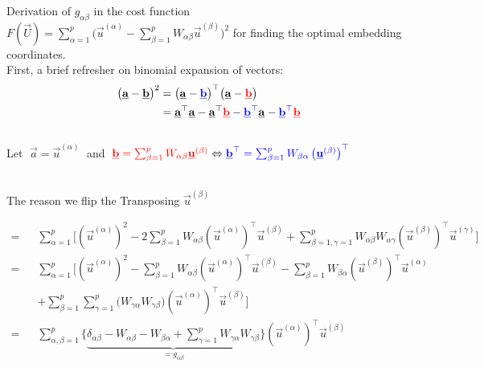 \begin{frame}%
	Derivation of $g_{\alpha \beta}$ in the cost function
	$F(\vec U) =
    \sum_{\alpha=1}^{p} 
	\bigg(  \vec{u}^{(\alpha)}  - \sum_{\beta=1}^{p} W_{\alpha \beta} \vec{u}^{(\beta)}
	\bigg) ^ 2
    $ 
    for finding the optimal embedding coordinates.\\
    First, a brief refresher on binomial expansion of vectors:
    \begin{align}
    \big( 
		\vec{a}
		- \vec{b}
	\big) ^ 2 
    &= \big(  \vec{a} - {\color{blue}\vec{b}} \big)^\top \big(  \vec{a} - {\color{red}\vec{b}} \big)\\
    &= \vec a^\top \vec a 
    - \vec a^\top {\color{red}\vec{b}}
    - {\color{blue}\vec{b}^\top} \vec a 
    - {\color{blue}\vec{b}^\top} {\color{red}\vec{b}}
    \end{align}\\
    
    Let $\;\vec a = \vec u^{(\alpha)}\;$ and 
    $\;{\color{red}
    \vec{b}=\sum_{\beta=1}^{p} W_{\alpha \beta} \vec{u}^{(\beta)}
    } \Leftrightarrow {\color{blue}
    \vec{b}^{\top}=\sum_{\beta=1}^{p} 
    W_{\beta \alpha} \left(\vec{u}^{(\beta)}\right)^\top
    }
    $
    
    \\
    The reason we flip the Transposing $\vec u^{(\beta)}$ 
    
    \begin{align}
	= &\sum_{\alpha=1}^{p} 
	\bigg[ 
	(\vec{u}^{(\alpha)})^2
	- 2 \sum_{\beta=1}^{p} W_{\alpha \beta} (\vec{u}^{(\alpha)} )^\top \vec{u}^{(\beta)}
	+
	\sum_{\beta=1, \gamma=1}^{p} W_{\alpha \beta} W_{\alpha \gamma} (\vec{u}^{(\beta)} )^\top \vec{u}^{(\gamma)}
	\bigg]
	\\
	= &\sum_{\alpha=1}^{p} 
	\bigg[ 
	(\vec{u}^{(\alpha)})^2
	- \sum_{\beta=1}^{p} W_{\alpha \beta} (\vec{u}^{(\alpha)} )^\top \vec{u}^{(\beta)}
	- \sum_{\beta=1}^{p} W_{\beta \alpha} (\vec{u}^{(\beta)} )^\top \vec{u}^{(\alpha)}
	\\~~~~~~~&+
	\sum_{\beta=1}^{p} 
		\sum_{\gamma=1}^{p} 
		\bigg(
			W_{\gamma \alpha} 
			W_{ \gamma \beta}
		\bigg) 
		(\vec{u}^{(\alpha)} )^\top \vec{u}^{(\beta)}
	\bigg]
	\\
	= &\sum_{\alpha, \beta=1}^{p} 
	\bigg\{ \underbrace{
		\delta_{\alpha \beta}
		- W_{\alpha \beta}
		- W_{\beta \alpha}
		+
		\sum_{\gamma=1}^{p} 
			W_{\gamma \alpha} W_{\gamma \beta} }_{=g_{\alpha \beta}}
	\bigg\}
	(\vec{u}^{(\alpha)} )^\top \vec{u}^{(\beta)}
	\end{align}
\end{frame}
